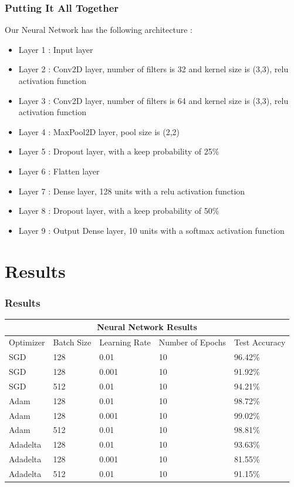 \documentclass{beamer}
\begin{document}
\begin{frame}
\frametitle{Putting It All Together}
\begin{block}{Our Neural Network has the following architecture :}
\begin{itemize}
\item Layer 1 : Input layer
\item Layer 2 : Conv2D layer, number of filters is 32 and kernel size is (3,3), relu activation function
\item Layer 3 : Conv2D layer, number of filters is 64 and kernel size is (3,3), relu activation function
\item Layer 4 : MaxPool2D layer, pool size is (2,2)
\item Layer 5 : Dropout layer, with a keep probability of 25\%
\item Layer 6 : Flatten layer
\item Layer 7 : Dense layer, 128 units with a relu activation function
\item Layer 8 : Dropout layer, with a keep probability of 50\%
\item Layer 9 : Output Dense layer, 10 units with a softmax activation function
\end{itemize}
\end{block}
\end{frame}

\section{Results}

\begin{frame}
\frametitle{Results}
\begin{center}
\begin{tabular}{|p{2cm}||p{2cm}|p{2cm}|p{2cm}|p{2cm}|}
\hline
\multicolumn{5}{|c|}{Neural Network Results} \\
\hline
Optimizer & Batch Size & Learning Rate & Number of Epochs & Test Accuracy\\
\hline
SGD & 128 & 0.01 & 10 & 96.42\%\\
\hline
SGD & 128 & 0.001 & 10 & 91.92\%\\
\hline
SGD & 512 & 0.01 & 10 & 94.21\%\\
\hline
Adam & 128 & 0.01 & 10 & 98.72\%\\
\hline
Adam & 128 & 0.001 & 10 & 99.02\%\\
\hline
Adam & 512 & 0.01 & 10 & 98.81\%\\
\hline
Adadelta & 128 & 0.01 &10 & 93.63\%\\
\hline
Adadelta & 128 & 0.001 &10 & 81.55\%\\
\hline
Adadelta & 512 & 0.01 &10 & 91.15\%\\
\hline
\end{tabular}
\end{center}
\end{frame}
\end{document}
